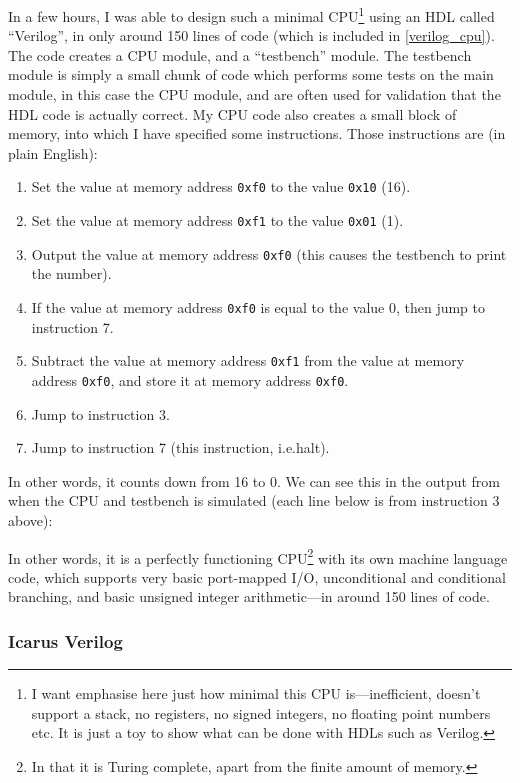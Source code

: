 \documentclass[12pt]{article}
\begin{document}
In a few hours, I was able to design such a minimal CPU\footnote{I want emphasise here just how minimal this CPU is---inefficient, doesn't support a stack, no registers, no signed integers, no floating point numbers etc. It is just a toy to show what can be done with HDLs such as Verilog.} using an HDL called ``Verilog'', in only around 150 lines of code (which is included in \ref{verilog_cpu}). The code creates a CPU module, and a ``testbench'' module. The testbench module is simply a small chunk of code which performs some tests on the main module, in this case the CPU module, and are often used for validation that the HDL code is actually correct. My CPU code also creates a small block of memory, into which I have specified some instructions. Those instructions are (in plain English):

\begin{enumerate}
	\item Set the value at memory address \texttt{0xf0} to the value \texttt{0x10} (16).
	\item Set the value at memory address \texttt{0xf1} to the value \texttt{0x01} (1).
	\item Output the value at memory address \texttt{0xf0} (this causes the testbench to print the number).
	\item If the value at memory address \texttt{0xf0} is equal to the value 0, then jump to instruction 7.
	\item Subtract the value at memory address \texttt{0xf1} from the value at memory address \texttt{0xf0}, and store it at memory address \texttt{0xf0}.
	\item Jump to instruction 3.
	\item Jump to instruction 7 (this instruction, i.e.\@ halt).
\end{enumerate}

In other words, it counts down from 16 to 0. We can see this in the output from when the CPU and testbench is simulated (each line below is from instruction 3 above):



In other words, it is a perfectly functioning CPU\footnote{In that it is Turing complete, apart from the finite amount of memory.} with its own machine language code, which supports very basic port-mapped I/O, unconditional and conditional branching, and basic unsigned integer arithmetic---in around 150 lines of code.

\subsubsection{Icarus Verilog}
\end{document}

